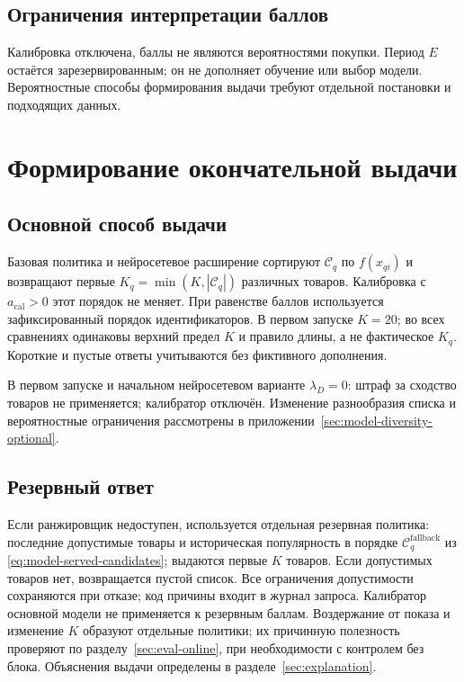\documentclass[12pt,a4paper]{article}
\theoremstyle{plainru}
\begin{document}
\subsection{Ограничения интерпретации баллов}\label{sec:model-calibration}

Калибровка отключена, баллы не являются вероятностями покупки.
Период $E$ остаётся зарезервированным; он не дополняет обучение
или выбор модели. Вероятностные способы формирования выдачи
требуют отдельной постановки и подходящих данных.

\section{Формирование окончательной выдачи}\label{sec:model-slate}

\subsection{Основной способ выдачи}

Базовая политика и нейросетевое расширение сортируют $\mathcal C_q$ по $f(x_{qi})$
и возвращают первые $K_q=\min(K,|\mathcal C_q|)$ различных товаров.
Калибровка с $a_{\mathrm{cal}}>0$ этот порядок не меняет.
При равенстве баллов используется зафиксированный порядок
идентификаторов. В первом запуске \(K=20\); во всех сравнениях
одинаковы верхний предел $K$ и правило длины, а не фактическое $K_q$.
Короткие и пустые ответы учитываются без фиктивного дополнения.

В первом запуске и начальном нейросетевом варианте \(\lambda_D=0\):
штраф за сходство товаров не применяется; калибратор отключён.
Изменение разнообразия списка и вероятностные ограничения рассмотрены в приложении~\ref{sec:model-diversity-optional}.

\subsection{Резервный ответ}

Если ранжировщик недоступен, используется отдельная резервная
политика: последние допустимые товары и историческая популярность
в порядке $\mathcal C_q^{\mathrm{fallback}}$ из
\eqref{eq:model-served-candidates}; выдаются первые $K$ товаров.
Если допустимых товаров нет,
возвращается пустой список. Все ограничения допустимости
сохраняются при отказе; код причины входит в журнал запроса.
Калибратор основной модели не применяется к резервным баллам.
Воздержание от показа и изменение $K$ образуют отдельные политики;
их причинную полезность проверяют по разделу~\ref{sec:eval-online},
при необходимости с контролем без блока.
Объяснения выдачи определены в разделе~\ref{sec:explanation}.
\end{document}
